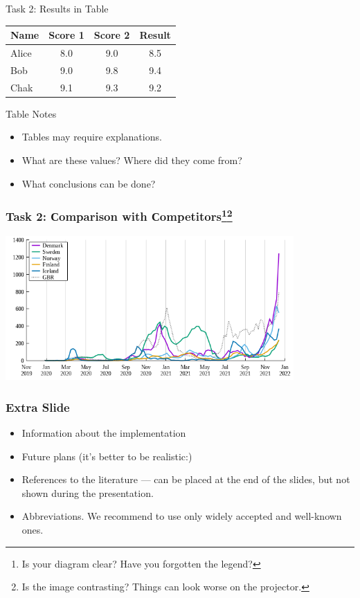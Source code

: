 \documentclass[12pt,aspectratio=169,hyperref={pdftex,unicode},xcolor=dvipsnames]{beamer}
\begin{document}
    \begin{frame}{Task 2: Results in Table}
        \centering
        \begin{tabular}{lccc}
            Name & Score 1 & Score 2 & Result \\
            \hline\hline
            Alice & 8.0 & 9.0 & 8.5 \\
            Bob & 9.0 & 9.8 & 9.4 \\
            Chak & 9.1 & 9.3 & 9.2 \\
        \end{tabular}

        \begin{block}{Table Notes}
            \begin{itemize}
                \item Tables may require explanations.
                \item What are these values? Where did they come from?
                \item What conclusions can be done?
            \end{itemize}
        \end{block}

    \end{frame}


    \begin{frame}
        \frametitle{Task 2: Сomparison with Сompetitors\footnote{Is your diagram clear? Have you forgotten the legend?}\footnote{Is the image contrasting? Things can look worse on the projector.}}
        \begin{center}
            \includegraphics[width=11cm]{images/graph.png}
        \end{center}
    \end{frame}

    \begin{frame}
        \frametitle{Extra Slide}
        \begin{itemize}
            \item Information about the implementation
            \item Future plans (it's better to be realistic:)
            \item References to the literature --- can be placed at the end of the slides, but not shown during the presentation.
            \item Abbreviations. We recommend to use only widely accepted and well-known ones.
        \end{itemize}

    \end{frame}
\end{document}
